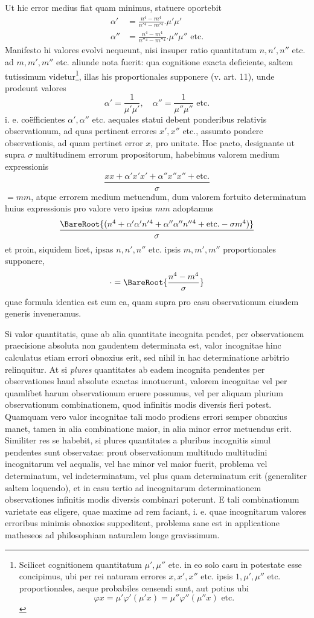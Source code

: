 Ut hic error medius fiat quam minimus, statuere oportebit
\[
\begin{aligned}
\alpha'&=\frac{n^4-m^4}{n'{}^4-m'{}^4}.\mu'\mu'\\[4pt]
\alpha''&=\frac{n^4-m^4}{n''{}^4-m''{}^4}.\mu''\mu''\text{ etc.}
\end{aligned}
\]
Manifesto hi valores evolvi nequeunt, nisi insuper ratio quantitatum \(n,n',n''\) etc. ad \(m,m',m''\) etc. aliunde nota fuerit: qua cognitione exacta deficiente, saltem tutissimum videtur\footnote{Scilicet cognitionem quantitatum \(\mu',\mu''\) etc. in eo solo casu in potestate esse concipimus, ubi per rei naturam errores \(x,x',x''\) etc. ipsis \(1,\mu',\mu''\) etc. proportionales, aeque probabiles censendi sunt, aut potius ubi
\[
\varphi x=\mu'\varphi'(\mu'x)=\mu''\varphi''(\mu''x)\text{ etc.}
\]
}, illas his proportionales supponere (v. art. 11), unde prodeunt valores
\[
\alpha'=\frac1{\mu'\mu'},\quad\alpha''=\frac1{\mu''\mu''}\text{ etc.}
\]
i. e. coëfficientes \(\alpha',\alpha''\) etc. aequales statui debent ponderibus relativis observationum, ad quas pertinent errores \(x',x''\) etc., assumto pondere observationis, ad quam pertinet error \(x\), pro unitate. Hoc pacto, designante ut supra \(\sigma\) multitudinem errorum propositorum, habebimus valorem medium expressionis
\[
\frac{xx+\alpha'x'x'+\alpha''x''x''+\text{etc.}}{\sigma}
\]
\(=mm\), atque errorem medium metuendum, dum valorem fortuito determinatum huius expressionis pro valore vero ipsius \(mm\) adoptamus
\[
\frac{\BareRoot{(n^4+\alpha'\alpha'n'{}^4+\alpha''\alpha''n''{}^4+\text{etc.}-\sigma m^4)}}{\sigma}
\]
et proin, siquidem licet, ipsas \(n,n',n''\) etc. ipsis \(m,m',m''\) proportionales supponere,
\[
\mathord{\cdot}=\BareRoot{\frac{n^4-m^4}{\sigma}}
\]
quae formula identica est cum ea, quam supra pro casu observationum eiusdem generis inveneramus.

Si valor quantitatis, quae ab alia quantitate incognita pendet, per observationem praecisione absoluta non gaudentem determinata est, valor incognitae hinc calculatus etiam errori obnoxius erit, sed nihil in hac determinatione arbitrio relinquitur. At si \textit{plures} quantitates ab eadem incognita pendentes per observationes haud absolute exactas innotuerunt, valorem incognitae vel per quamlibet harum observationum eruere possumus, vel per aliquam plurium observationum combinationem, quod infinitis modis diversis fieri potest. Quamquam vero valor incognitae tali modo prodiens errori semper obnoxius manet, tamen in alia combinatione maior, in alia minor error metuendus erit. Similiter res se habebit, si plures quantitates a pluribus incognitis simul pendentes sunt observatae: prout observationum multitudo multitudini incognitarum vel aequalis, vel hac minor vel maior fuerit, problema vel determinatum, vel indeterminatum, vel plus quam determinatum erit (generaliter saltem loquendo), et in casu tertio ad incognitarum determinationem observationes infinitis modis diversis combinari poterunt. E tali combinationum varietate eas eligere, quae maxime ad rem faciant, i. e. quae incognitarum valores erroribus minimis obnoxios suppeditent, problema sane est in applicatione matheseos ad philosophiam naturalem longe gravissimum.


